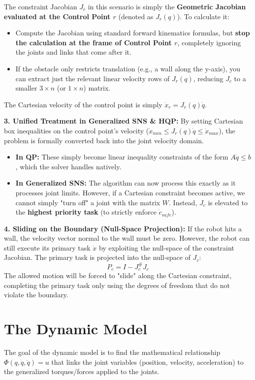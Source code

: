 \documentclass[11pt,a4paper]{article}
\begin{document}
The constraint Jacobian $J_c$ in this scenario is simply the \textbf{Geometric Jacobian evaluated at the Control Point $r$} (denoted as $J_r(q)$). To calculate it:
\begin{itemize}
    \item Compute the Jacobian using standard forward kinematics formulas, but \textbf{stop the calculation at the frame of Control Point $r$}, completely ignoring the joints and links that come after it.
    \item If the obstacle only restricts translation (e.g., a wall along the y-axis), you can extract just the relevant linear velocity rows of $J_r(q)$, reducing $J_c$ to a smaller $3 \times n$ (or $1 \times n$) matrix.
\end{itemize}
The Cartesian velocity of the control point is simply $\dot{x}_r = J_r(q) \dot{q}$.

\textbf{3. Unified Treatment in Generalized SNS \& HQP:}
By setting Cartesian box inequalities on the control point's velocity ($\dot{x}_{min} \le J_r(q)\dot{q} \le \dot{x}_{max}$), the problem is formally converted back into the joint velocity domain. 
\begin{itemize}
    \item \textbf{In QP:} These simply become linear inequality constraints of the form $A\dot{q} \le b$, which the solver handles natively.
    \item \textbf{In Generalized SNS:} The algorithm can now process this exactly as it processes joint limits. However, if a Cartesian constraint becomes active, we cannot simply "turn off" a joint with the matrix $W$. Instead, $J_c$ is elevated to the \textbf{highest priority task} (to strictly enforce $\dot{c}_{safe}$).
\end{itemize}

\textbf{4. Sliding on the Boundary (Null-Space Projection):}
If the robot hits a wall, the velocity vector normal to the wall must be zero. However, the robot can still execute its primary task $\dot{x}$ by exploiting the null-space of the constraint Jacobian. The primary task is projected into the null-space of $J_c$:
\begin{equation}
    P_c = I - J_c^\# J_c
\end{equation}
The allowed motion will be forced to "slide" along the Cartesian constraint, completing the primary task only using the degrees of freedom that do not violate the boundary.
\section{The Dynamic Model}
The goal of the dynamic model is to find the mathematical relationship $\Phi(q, \dot{q}, \ddot{q}) = u$ that links the joint variables (position, velocity, acceleration) to the generalized torques/forces applied to the joints.
\end{document}
